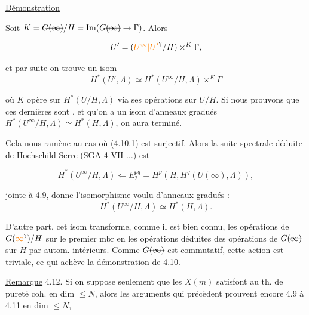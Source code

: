 
\uline{Démonstration} 

Soit $K=G\deleted{(\infty)}/H=\operatorname{Im}(G\deleted{(\infty)}\to\Gamma)$. Alors

\[
U'=(\unsure{U^\infty|U'}/H)\mathbin{\times^K}\Gamma,
\]

et par suite on trouve un isom 
\[
H^*(U',\Lambda)\simeq H^*(U^\infty/H,\Lambda)\mathbin{\times^K}\Gamma
\]

où $K$ opère sur $H^*(U/H,\Lambda)$ via ses opérations sur $U/H$. Si nous prouvons que ces dernières sont ,  et qu'on a un isom d'anneaux gradués $H^*(U^\infty/H,\Lambda)\simeq H^*(H,\Lambda)$, on aura terminé.

Cela nous ramène au cas où (4.10.1) est \uline{surjectif}. Alors la suite spectrale déduite de Hochschild Serre (SGA 4 \uline{VII} $\ldots$) est

\[
H^*(U^\infty/H,\Lambda)\Longleftarrow E_2^{pq}=H^p(H,H^q(U(\infty),\Lambda)),
\]


jointe à 4.9,  donne l'isomorphisme voulu d'anneaux gradués :
\[
H^*(U^\infty/H,\Lambda)\simeq H^*(H,\Lambda).
\]

D'autre part, cet isom transforme, comme il est bien connu, les opérations de $G\deleted{(\unsure{\infty})}/H$ sur le premier mbr en les opérations déduites des opérations de $G\deleted{(\infty)}$ sur $H$ par autom. intérieurs. Comme $G\deleted{(\infty)}$ est commutatif, cette action est triviale, ce qui achève la démonstration de 4.10.

\uline{Remarque} 4.12. Si on suppose seulement que les $X(m)$ satisfont au th. de pureté coh. en dim $\leq N$, alors les arguments qui précèdent prouvent encore 4.9 à 4.11 en dim $\leq N$, 

